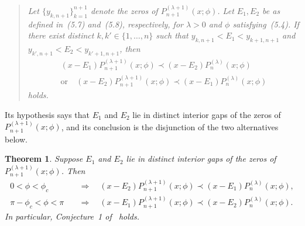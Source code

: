 \documentclass[11pt]{amsart}
\newtheorem{theorem}{Theorem}[section]
\theoremstyle{remark}
\begin{document}
\begin{quote}
\emph{Let $\{y_{k,n+1}\}_{k=1}^{n+1}$ denote the zeros
of $P_{n+1}^{(\lambda+1)}(x;\phi)$.  Let $E_1, E_2$ be as defined
in~\textup{(5.7)} and~\textup{(5.8)}, respectively, for $\lambda>0$ and $\phi$
satisfying~\textup{(5.4)}.  If there exist distinct $k, k' \in \{1, \dots, n\}$
such that $y_{k,n+1} < E_1 < y_{k+1,n+1}$ and
$y_{k',n+1} < E_2 < y_{k'+1,n+1}$, then
\begin{gather*}
 (x-E_1)P_{n+1}^{(\lambda+1)}(x;\phi) \prec (x-E_2)P_{n}^{(\lambda)}(x;\phi)\\
 \text{or}\quad
 (x-E_2)P_{n+1}^{(\lambda+1)}(x;\phi) \prec (x-E_1)P_{n}^{(\lambda)}(x;\phi)
\end{gather*}
holds.}
\end{quote}

\noindent
Its hypothesis says that $E_1$ and $E_2$ lie in distinct interior gaps of the
zeros of $P_{n+1}^{(\lambda+1)}(x;\phi)$, and its conclusion is the disjunction
of the two alternatives below.

\begin{theorem}\label{thm:MP}
Suppose $E_1$ and $E_2$ lie in distinct interior gaps of the zeros of
$P_{n+1}^{(\lambda+1)}(x;\phi)$.  Then
\begin{align*}
 0<\phi<\phi_c
 &\quad\Longrightarrow\quad
 (x-E_2)P_{n+1}^{(\lambda+1)}(x;\phi)
 \prec (x-E_1)P_n^{(\lambda)}(x;\phi),\\
 \pi-\phi_c<\phi<\pi
 &\quad\Longrightarrow\quad
 (x-E_1)P_{n+1}^{(\lambda+1)}(x;\phi)
 \prec (x-E_2)P_n^{(\lambda)}(x;\phi).
\end{align*}
In particular, Conjecture~1 of~\cite{JordaanKumar} holds.
\end{theorem}
\end{document}
